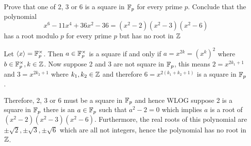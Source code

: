 \begin{exercise}
    Prove that one of 2, 3 or 6 is a square in $\mathbb{F}_p$ for every prime $p$. Conclude that the polynomial \[x^6 - 11x^4 + 36x^2 - 36 = (x^2 - 2)(x^2 - 3)(x^2 - 6)\] has a root modulo $p$ for every prime $p$ but has no root in $\mathbb{Z}$
\end{exercise}
\begin{solution}
    Let $\langle x \rangle = \mathbb{F}_p^{\times}$. Then $a \in \mathbb{F}_p^{\times}$ is a square if and only if $a = x^{2k} = (x^k)^2$ where $b \in \mathbb{F}_p^{\times}, k \in \mathbb{Z}$. Now suppose 2 and 3 are not square in $\mathbb{F}_p$, this means $2 = x^{2k_1 + 1}$ and $3 = x^{2k_2 + 1}$ where $k_1, k_2 \in \mathbb{Z}$ and therefore $6 = x^{2(k_1 + k_2 + 1)}$ is a square in $\mathbb{F}_p$.

    \noindent Therefore, 2, 3 or 6 must be a square in $\mathbb{F}_p$ and hence WLOG suppose 2 is a square in $\mathbb{F}_p$ there is an $a \in \mathbb{F}_p$ such that $a^2 - 2 = 0$ which implies $a$ is a root of $(x^2 - 2)(x^2 - 3)(x^2 - 6)$. Furthermore, the real roots of this polynomial are $\pm \sqrt{2}, \pm \sqrt{3}, \pm \sqrt{6}$ which are all not integers, hence the polynomial has no root in $\mathbb{Z}$.
\end{solution}